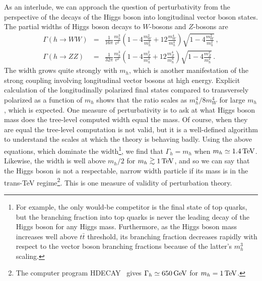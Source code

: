 \documentclass[12pt]{article}
\def\bea{\begin{eqnarray}}
\def\eea{\end{eqnarray}}
\def\tev{\, {\rm TeV}}
\def\gev{\, {\rm GeV}}
\newcommand{\gsim}{\lower.7ex\hbox{$\;\stackrel{\textstyle>}{\sim}\;$}}
\begin{document}
As an interlude, we can approach the question of perturbativity from the perspective of the decays of the Higgs boson into longitudinal vector boson states. The partial widths of Higgs boson decays to $W$-bosons and $Z$-bosons are
\bea
\Gamma(h\to WW) & = & \frac{1}{16\pi}\frac{m_h^3}{v^2}\left( 1-4\frac{m_W^2}{m_h^2}+12\frac{m^4_W}{m^4_h}\right) \sqrt{1-4\frac{m_W^2}{m^2_h}}\, ,  \\ %
\Gamma(h\to ZZ) & = & \frac{1}{32\pi}\frac{m_h^3}{v^2}\left( 1-4\frac{m_Z^2}{m_h^2}+12\frac{m^4_Z}{m^4_h}\right) \sqrt{1-4\frac{m_Z^2}{m^2_h}} \, .
\eea
The width grows quite strongly with $m_h$, which is another manifestation of the strong coupling involving longitudinal vector bosons at high energy.  Explicit calculation of the longitudinally polarized final states compared to transversely polarized as a function of $m_h$ shows that the ratio scales as $m_h^4/8m_W^4$ for large $m_h$, which is expected. One measure of perturbativity is to ask at what Higgs boson mass does the tree-level computed width equal the mass.  Of course, when they are equal the tree-level computation is not valid, but it is a well-defined algorithm to understand the scales at which the theory is behaving badly. Using the above equations, which dominate the width\footnote{For example, the only would-be competitor is the final state of top quarks, but the branching fraction into top quarks is never the leading decay of the Higgs boson for any Higgs mass. Furthermore, as the Higgs boson mass increases well above $t\bar t$ threshold, its branching fraction decreases rapidly with respect to the vector boson branching fractions because of the latter's $m_h^3$ scaling.}, we find that $\Gamma_h=m_h$ when $m_h\simeq 1.4\tev$.   Likewise, the width is well above $m_h/2$ for $m_h\gsim 1\tev$, and so we can say that the Higgs boson is not a respectable, narrow width particle if its mass is in the trans-TeV regime\footnote{The computer program HDECAY~\cite{Djouadi:1997yw} gives $\Gamma_h\simeq 650\gev$ for $m_h=1\tev$.}. This is one measure of validity of perturbation theory.
\end{document}
